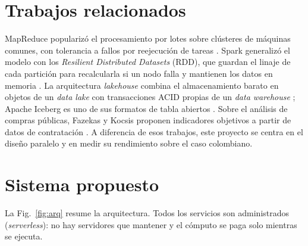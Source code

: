 \documentclass[conference]{IEEEtran}
\begin{document}
\section{Trabajos relacionados}
MapReduce popularizó el procesamiento por lotes sobre clústeres de máquinas comunes, con tolerancia a fallos por reejecución de tareas \cite{dean2008}. Spark generalizó el modelo con los \textit{Resilient Distributed Datasets} (RDD), que guardan el linaje de cada partición para recalcularla si un nodo falla y mantienen los datos en memoria \cite{zaharia2012,zaharia2016}. La arquitectura \textit{lakehouse} combina el almacenamiento barato en objetos de un \textit{data lake} con transacciones ACID propias de un \textit{data warehouse} \cite{armbrust2021}; Apache Iceberg es uno de sus formatos de tabla abiertos \cite{iceberg}. Sobre el análisis de compras públicas, Fazekas y Kocsis proponen indicadores objetivos a partir de datos de contratación \cite{fazekas2020}. A diferencia de esos trabajos, este proyecto se centra en el diseño paralelo y en medir su rendimiento sobre el caso colombiano.

\section{Sistema propuesto}
La Fig.~\ref{fig:arq} resume la arquitectura. Todos los servicios son administrados (\textit{serverless}): no hay servidores que mantener y el cómputo se paga solo mientras se ejecuta.
\end{document}
